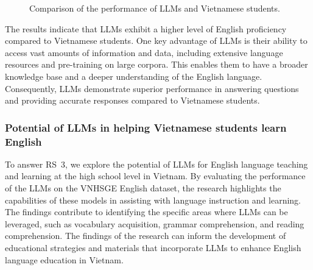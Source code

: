 \documentclass[11pt]{article}
\begin{document}
\begin{figure*}[ht!]
	\begin{center}
	\end{center}
	\caption{Comparison of the performance of LLMs and Vietnamese students.}
	\label{fig:comparison}
\end{figure*}

The results indicate that LLMs exhibit a higher level of English proficiency compared to Vietnamese students. One key advantage of LLMs is their ability to access vast amounts of information and data, including extensive language resources and pre-training on large corpora. This enables them to have a broader knowledge base and a deeper understanding of the English language. Consequently, LLMs demonstrate superior performance in answering questions and providing accurate responses compared to Vietnamese students.

\subsubsection{Potential of LLMs in helping Vietnamese students learn English}

To answer RS~3, we explore the potential of LLMs for English language teaching and learning at the high school level in Vietnam. By evaluating the performance of the LLMs on the VNHSGE English dataset, the research highlights the capabilities of these models in assisting with language instruction and learning. The findings contribute to identifying the specific areas where LLMs can be leveraged, such as vocabulary acquisition, grammar comprehension, and reading comprehension. The findings of the research can inform the development of educational strategies and materials that incorporate LLMs to enhance English language education in Vietnam. 
\end{document}
